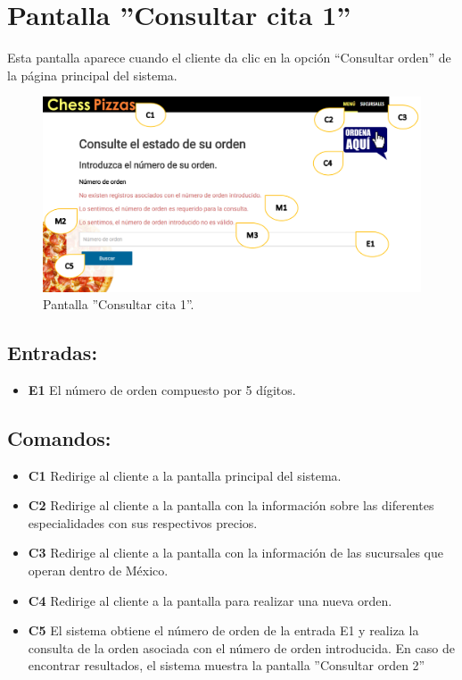 \documentclass[oneside,10pt]{book}
\title{}
\subtitle{}
\author{}
\begin{document}
\section{Pantalla ''Consultar cita 1''}

Esta pantalla aparece cuando el cliente da clic en la opción “Consultar orden” de la página principal del sistema.

\begin{figure}[htbp!]
		\centering
			\includegraphics[width=1.1\textwidth]{images/1}
		\caption{Pantalla ''Consultar cita 1''.}
	\end{figure}
	
\subsection{Entradas:}
\begin{itemize}
\item \textbf{E1} El número de orden compuesto por 5 dígitos.
\end{itemize}

\subsection{Comandos:}
\begin{itemize}
\item \textbf{C1} Redirige al cliente a la pantalla principal del sistema.
\item \textbf{C2} Redirige al cliente a la pantalla con la información sobre las diferentes especialidades con sus respectivos precios.
\item \textbf{C3} Redirige al cliente a la pantalla con la información de las sucursales que operan dentro de México.
\item \textbf{C4} Redirige al cliente a la pantalla para realizar una nueva orden.
\item \textbf{C5} El sistema obtiene el número de orden de la entrada E1 y realiza la consulta de la orden asociada con el número de orden introducida. En caso de encontrar resultados, el sistema muestra la pantalla ''Consultar orden 2''
\end{itemize}
\end{document}
